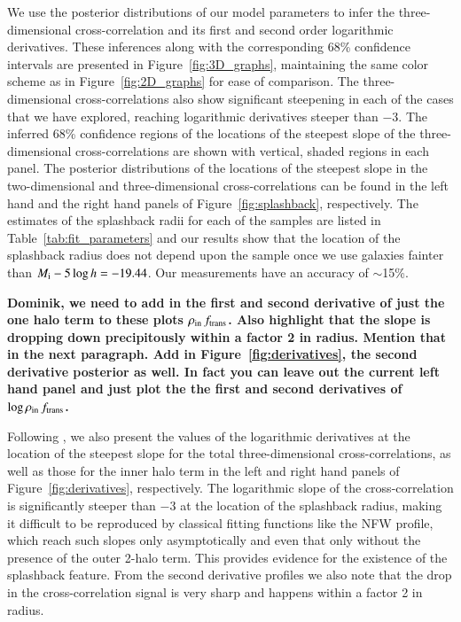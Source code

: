 \documentclass[iop, apjl, twocolappendix, numberedappendix]{emulateapj}
\begin{document}
We use the posterior distributions of our model parameters to infer
the three-dimensional cross-correlation and its first and second order logarithmic
derivatives. These inferences along with the corresponding 68\%
confidence intervals are presented in Figure~\ref{fig:3D_graphs},
maintaining the same color scheme as in Figure~\ref{fig:2D_graphs}
for ease of comparison. The three-dimensional cross-correlations
also show significant steepening in each of the cases that we have
explored, reaching logarithmic derivatives steeper than $-3$. The
inferred 68\% confidence regions of the locations of the steepest
slope of the three-dimensional cross-correlations are shown with
vertical, shaded regions in each panel. The posterior
distributions of the locations of the steepest slope in the
two-dimensional and three-dimensional cross-correlations can be
found in the left hand and the right hand panels of
Figure~\ref{fig:splashback}, respectively. The estimates of the splashback radii
for each of the samples are listed in Table~\ref{tab:fit_parameters}
and our results show that the location of the splashback radius does
not depend upon the sample once we use galaxies fainter than $M_{\rm
i}-5\log h=-19.44$. Our measurements have an accuracy of $\sim$15\%.

{\bf Dominik, we need to add in the first and second derivative of just the one
halo term to these plots $\rho_{\rm in}\,f_{\rm trans}$. Also highlight that
the slope is dropping down precipitously within a factor 2 in radius. Mention
that in the next paragraph. Add in Figure~\ref{fig:derivatives}, the second
derivative posterior as well. In fact you can leave out the current left hand
panel and just plot the the first and second derivatives of $\log\rho_{\rm
in}\,f_{\rm trans}$.}

Following \citet{baxter2017halo}, we also present the values of the
logarithmic derivatives at the location of the steepest slope for
the total three-dimensional cross-correlations, as well as those for
the inner halo term in the left and right hand panels of
Figure~\ref{fig:derivatives}, respectively. The logarithmic slope of the 
cross-correlation is significantly steeper than $-3$ at the location 
of the splashback radius, making it difficult to
be reproduced by classical fitting functions like the NFW profile,
which reach such slopes only asymptotically and even that only
without the presence of the outer 2-halo term. This provides
evidence for the existence of the splashback feature. From the second
derivative profiles we also note that the drop in the cross-correlation
signal is very sharp and happens within a factor 2 in radius.
\end{document}
